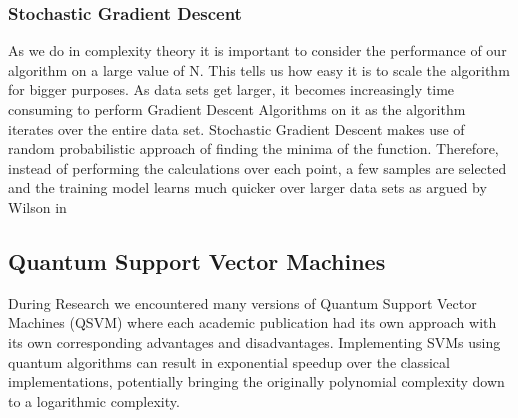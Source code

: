 \documentclass{article}
\begin{document}
\subsubsection{Stochastic Gradient Descent}
\par
As we do in complexity theory it is important to consider the performance of our algorithm on a large value of N. This tells us how easy it is to scale the algorithm for bigger purposes. As data sets get larger, it becomes increasingly time consuming to perform Gradient Descent Algorithms on it as the algorithm iterates over the entire data set. Stochastic Gradient Descent makes use of random probabilistic approach of finding the minima of the function. Therefore, instead of performing the calculations over each point, a few samples are selected and the training model learns much quicker over larger data sets as argued by Wilson in \cite {BOOK:4}\cite {BOOK:5}
\subsection{Quantum Support Vector Machines}

\par
During Research we encountered many versions of Quantum Support Vector Machines (QSVM) where each academic publication had its own approach with its own corresponding advantages and disadvantages. Implementing SVMs using quantum algorithms can result in exponential speedup over the classical implementations, potentially bringing the originally polynomial complexity down to a logarithmic complexity. 
\end{document}
